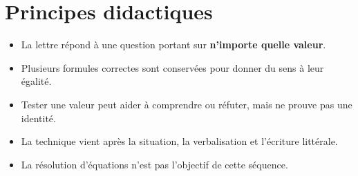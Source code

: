 \documentclass[12pt,a4paper]{article}
\begin{document}
\section*{Principes didactiques}

\begin{itemize}
  \item La lettre répond à une question portant sur \textbf{n'importe quelle valeur}.
  \item Plusieurs formules correctes sont conservées pour donner du sens à leur égalité.
  \item Tester une valeur peut aider à comprendre ou réfuter, mais ne prouve pas une identité.
  \item La technique vient après la situation, la verbalisation et l'écriture littérale.
  \item La résolution d'équations n'est pas l'objectif de cette séquence.
\end{itemize}
\end{document}
